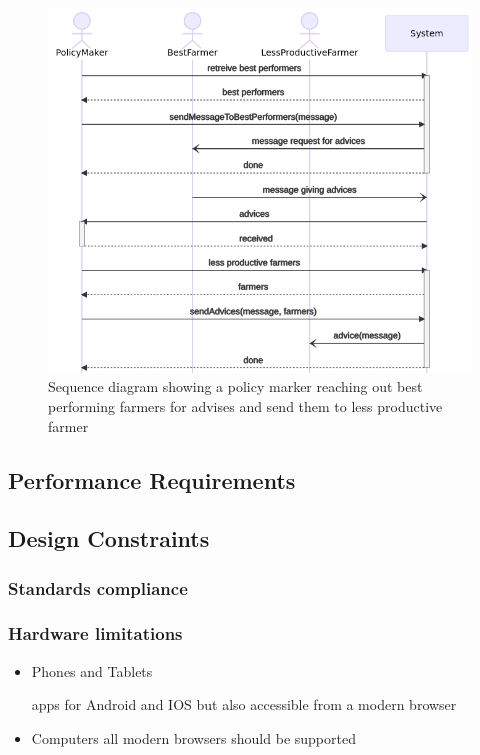 \begin{figure}[H]
	\centering
	\includegraphics[width=\textwidth]{Images/seq-policy-farmers.png}
	\caption{\label{fig:seqpolicymaker} Sequence diagram showing a policy marker reaching out best performing farmers for advises and send them to less productive farmer}
\end{figure}

\subsection{Performance Requirements}

\subsection{Design Constraints}
\subsubsection{Standards compliance}
\subsubsection{Hardware limitations}
\begin{itemize}
	\item Phones and Tablets
	
	\subitem apps for Android and IOS
	\subitem but also accessible from a modern browser
	\item Computers
	\subitem all modern browsers should be supported
	
\end{itemize}
